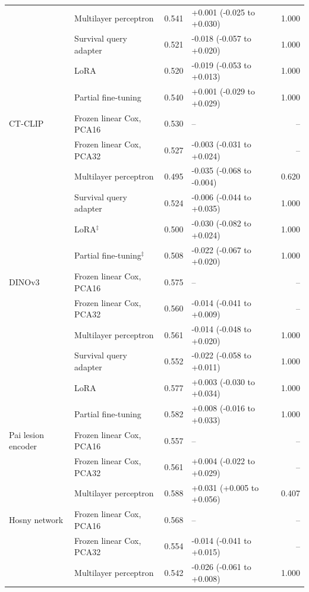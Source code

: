 \begin{table}[!htbp]
\begin{tabular}{@{}llrlr@{}}
 & Multilayer perceptron & 0.541 & +0.001 (-0.025 to +0.030) & 1.000 \\
 & Survival query adapter & 0.521 & -0.018 (-0.057 to +0.020) & 1.000 \\
 & LoRA & 0.520 & -0.019 (-0.053 to +0.013) & 1.000 \\
 & Partial fine-tuning & 0.540 & +0.001 (-0.029 to +0.029) & 1.000 \\
\addlinespace
CT-CLIP & Frozen linear Cox, PCA16 & 0.530 & -- & -- \\
 & Frozen linear Cox, PCA32 & 0.527 & -0.003 (-0.031 to +0.024) & -- \\
 & Multilayer perceptron & 0.495 & -0.035 (-0.068 to -0.004) & 0.620 \\
 & Survival query adapter & 0.524 & -0.006 (-0.044 to +0.035) & 1.000 \\
 & LoRA$^{\ddagger}$ & 0.500 & -0.030 (-0.082 to +0.024) & 1.000 \\
 & Partial fine-tuning$^{\ddagger}$ & 0.508 & -0.022 (-0.067 to +0.020) & 1.000 \\
\addlinespace
DINOv3 & Frozen linear Cox, PCA16 & 0.575 & -- & -- \\
 & Frozen linear Cox, PCA32 & 0.560 & -0.014 (-0.041 to +0.009) & -- \\
 & Multilayer perceptron & 0.561 & -0.014 (-0.048 to +0.020) & 1.000 \\
 & Survival query adapter & 0.552 & -0.022 (-0.058 to +0.011) & 1.000 \\
 & LoRA & 0.577 & +0.003 (-0.030 to +0.034) & 1.000 \\
 & Partial fine-tuning & 0.582 & +0.008 (-0.016 to +0.033) & 1.000 \\
\addlinespace
Pai lesion encoder & Frozen linear Cox, PCA16 & 0.557 & -- & -- \\
 & Frozen linear Cox, PCA32 & 0.561 & +0.004 (-0.022 to +0.029) & -- \\
 & Multilayer perceptron & 0.588 & +0.031 (+0.005 to +0.056) & 0.407 \\
\addlinespace
Hosny network & Frozen linear Cox, PCA16 & 0.568 & -- & -- \\
 & Frozen linear Cox, PCA32 & 0.554 & -0.014 (-0.041 to +0.015) & -- \\
 & Multilayer perceptron & 0.542 & -0.026 (-0.061 to +0.008) & 1.000 \\
\bottomrule
\end{tabular}
\end{table}
